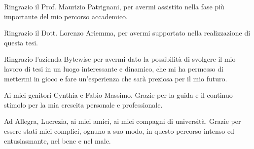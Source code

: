 Ringrazio il Prof. Maurizio Patrignani, per avermi assistito nella fase più importante del mio percorso accademico.

\noindent Ringrazio il Dott. Lorenzo Ariemma, per avermi supportato nella realizzazione di questa tesi.

\noindent Ringrazio l'azienda Bytewise per avermi dato la possibilità di svolgere il mio lavoro di tesi in un luogo interessante e dinamico, che mi ha permesso di mettermi in gioco e fare un'esperienza che sarà preziosa per il mio futuro.

\noindent Ai miei genitori Cynthia e Fabio Massimo. Grazie per la guida e il continuo stimolo per la mia crescita personale e professionale.

\noindent Ad Allegra, Lucrezia, ai miei amici, ai miei compagni di università. Grazie per essere stati miei complici, ognuno a suo modo, in questo percorso intenso ed entusiasmante, nel bene e nel male.

